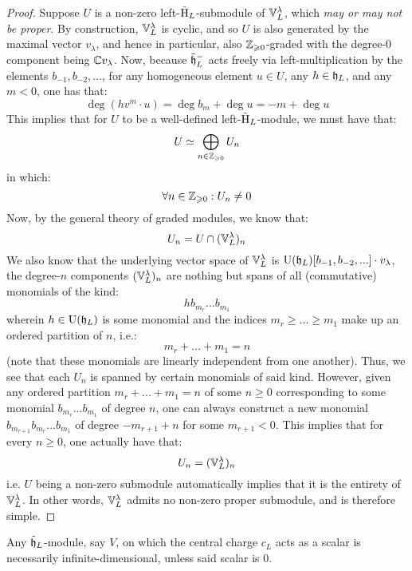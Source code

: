             \begin{proof}
                Suppose $U$ is a non-zero left-$\tilde{\mathrm{H}}_L$-submodule of $\mathbb{V}_L^{\lambda}$, which \textit{may or may not be proper}. By construction, $\mathbb{V}_L^{\lambda}$ is cyclic, and so $U$ is also generated by the maximal vector $v_{\lambda}$, and hence in particular, also $\mathbb{Z}_{\geqslant 0}$-graded with the degree-$0$ component being $\mathbb{C} v_{\lambda}$. Now, because $\tilde{\mathfrak{h}}_L^-$ acts freely via left-multiplication by the elements $b_{-1}, b_{-2}, ...$, for any homogeneous element $u \in U$, any $h \in \mathfrak{h}_L$, and any $m < 0$, one has that:
                    $$\deg( h v^m \cdot u ) = \deg b_m + \deg u = -m + \deg u$$
                This implies that for $U$ to be a well-defined left-$\tilde{\mathrm{H}}_L$-module, we must have that:
                    $$U \simeq \bigoplus_{n \in \mathbb{Z}_{\geqslant 0}} U_n$$
                in which:
                    $$\forall n \in \mathbb{Z}_{\geqslant 0}: U_n \not = 0$$
                Now, by the general theory of graded modules, we know that:
                    $$U_n = U \cap (\mathbb{V}_L^{\lambda})_n$$
                We also know that the underlying vector space of $\mathbb{V}_L^{\lambda}$ is $\mathrm{U}(\mathfrak{h}_L)[b_{-1}, b_{-2}, ...] \cdot v_{\lambda}$, the degree-$n$ components $(\mathbb{V}_L^{\lambda})_n$ are nothing but spans of all (commutative) monomials of the kind:
                    $$h b_{m_r} ... b_{m_1}$$
                wherein $h \in \mathrm{U}(\mathfrak{h}_L)$ is some monomial and the indices $m_r \geq ... \geq m_1$ make up an ordered partition of $n$, i.e.:
                    $$m_r + ... + m_1 = n$$
                (note that these monomials are linearly independent from one another). Thus, we see that each $U_n$ is spanned by certain monomials of said kind. However, given any ordered partition $m_r + ... + m_1 = n$ of some $n \geq 0$ corresponding to some monomial $b_{m_r} ... b_{m_1}$ of degree $n$, one can always construct a new monomial $b_{m_{r + 1}} b_{m_r} ... b_{m_1}$ of degree $-m_{r + 1} + n$ for some $m_{r + 1} < 0$. This implies that for every $n \geq 0$, one actually have that:
                    $$U_n = (\mathbb{V}_L^{\lambda})_n$$
                i.e. $U$ being a non-zero submodule automatically implies that it is the entirety of $\mathbb{V}_L^{\lambda}$. In other words, $\mathbb{V}_L^{\lambda}$ admits no non-zero proper submodule, and is therefore simple.
            \end{proof}
        \begin{lemma}
            Any $\tilde{\mathfrak{h}}_L$-module, say $V$, on which the central charge $c_L$ acts as a scalar is necessarily infinite-dimensional, unless said scalar is $0$.
        \end{lemma}
